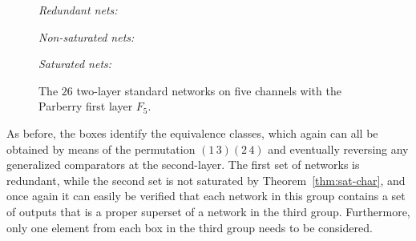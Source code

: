 \documentclass[10pt]{IEEEtran}
\begin{document}
\begin{figure}

\smallskip\emph{Redundant nets:}\smallskip


\smallskip
{}

\smallskip\emph{Non-saturated nets:}\smallskip


\smallskip
{}

\smallskip\emph{Saturated nets:}\smallskip


\smallskip
{}

  \caption{The $26$ two-layer standard networks on five channels with the Parberry first layer $F_5$.}
  \label{fig:5wire}
\end{figure}

As before, the boxes identify the equivalence classes, which again can all be
obtained by means of the permutation $(1\,3)(2\,4)$ and eventually reversing any
generalized comparators at the second-layer.  The first set of networks is
redundant, while the second set is not saturated by Theorem~\ref{thm:sat-char},
and once again it can easily be verified that each network in this group
contains a set of outputs that is a proper superset of a network in the third
group.  Furthermore, only one element from each box in the third group needs to be
considered.
\end{document}
